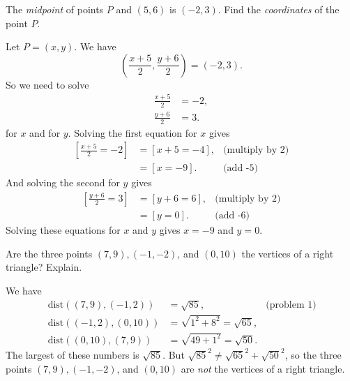 \documentclass[12pt,fleqn]{exam}
\newcommand{\dist}{\, \mathrm{dist}}
\begin{document}
\begin{questions}
\begin{solution}[2.0in]
\end{solution}

\question[5] The \emph{midpoint} of points $P$ and $(5,6)$ is $(-2,3)$. Find the 
\emph{coordinates} of the point $P$.
\begin{solution}[2.0in] Let $P = (x,y)$. We have
    \begin{equation*}
        \left(\frac{x+5}{2}, \frac{y+6}{2} \right) = (-2,3).
    \end{equation*}
    So we need to solve
    \begin{align*}
        \frac{x+5}{2} &= -2,\\
        \frac{y+6}{2} &= 3.
    \end{align*}
    for $x$ and for $y$. Solving the first equation for $x$ gives
    \begin{align*}
        \left[  \frac{x+5}{2} = -2 \right] &= [x + 5 = -4], &\mbox{(multiply by 2)}\\
                                            &= [x=-9]. &\mbox{(add -5)}
    \end{align*}
    And solving the second for $y$ gives
    \begin{align*}
        \left[  \frac{y+6}{2} = 3 \right] &= [y+6 = 6], &\mbox{(multiply by 2)}\\
                                           &= [y=0]. &\mbox{(add -6)}
    \end{align*}
    Solving these equations for $x$ and $y$ gives $x=-9$ and $y=0$.

\end{solution}


\question[5] Are the three points  $(7,9), (-1,-2)$, and  $(0,10)$ the vertices of
a right triangle? Explain.

\begin{solution}
We have
\begin{align*}
    \dist((7,9), (-1,2)) &= \sqrt{85}, &\mbox{(problem 1)}\\
    \dist((-1,2), (0,10)) &= \sqrt{1^2 + 8^2} = \sqrt{65}, \\
    \dist((0,10),(7,9)) &= \sqrt{49 + 1^2} = \sqrt{50}.
\end{align*}
The largest of these numbers is $\sqrt{85}$. But $\sqrt{85}^2 \neq \sqrt{65}^2 + \sqrt{50}^2$,
so the three points $(7,9), (-1,-2)$, and  $(0,10)$ are \emph{not} the vertices of a
right triangle.

\end{solution}

\end{questions}
\end{document}
